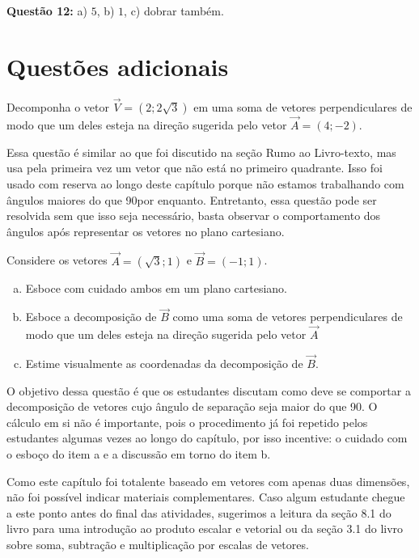 \documentclass[main_estudante.tex]{subfiles}
\begin{document}
\noindent\textbf{Questão 12:} a) $5$, b) $1$, c) dobrar também.

\section{Questões adicionais}

\begin{adicional}
Decomponha o vetor $\overrightarrow{V}=(2;2\sqrt{3})$ em uma soma de vetores perpendiculares de modo que um deles esteja na direção sugerida pelo vetor $\overrightarrow{A}=(4;-2)$.
\end{adicional}

Essa questão é similar ao que foi discutido na seção Rumo ao Livro-texto, mas usa pela primeira vez um vetor que não está no primeiro quadrante. Isso foi usado com reserva ao longo deste capítulo porque não estamos trabalhando com ângulos maiores do que 90\degree por enquanto. Entretanto, essa questão pode ser resolvida sem que isso seja necessário, basta observar o comportamento dos ângulos após representar os vetores no plano cartesiano.

\begin{adicional}
Considere os vetores $\overrightarrow{A}=(\sqrt{3};1)$ e $\overrightarrow{B}=(-1;1)$.
\begin{enumerate}[a)]
\item Esboce com cuidado ambos em um plano cartesiano.
\item Esboce a decomposição de $\overrightarrow{B}$ como uma soma de vetores perpendiculares de modo que um deles esteja na direção sugerida pelo vetor $\overrightarrow{A}$
\item Estime visualmente as coordenadas da decomposição de $\overrightarrow{B}$.
\end{enumerate}
\end{adicional}

O objetivo dessa questão é que os estudantes discutam como deve se comportar a decomposição de vetores cujo ângulo de separação seja maior do que 90\degree. O cálculo em si não é importante, pois o procedimento já foi repetido pelos estudantes algumas vezes ao longo do capítulo, por isso incentive: o cuidado com o esboço do item a e a discussão em torno do item b.

Como este capítulo foi totalente baseado em vetores com apenas duas dimensões, não foi possível indicar materiais complementares. Caso algum estudante chegue a este ponto antes do final das atividades, sugerimos a leitura da seção 8.1 do livro  para uma introdução ao produto escalar e vetorial ou da seção 3.1 do livro  sobre soma, subtração e multiplicação por escalas de vetores.
\end{document}
